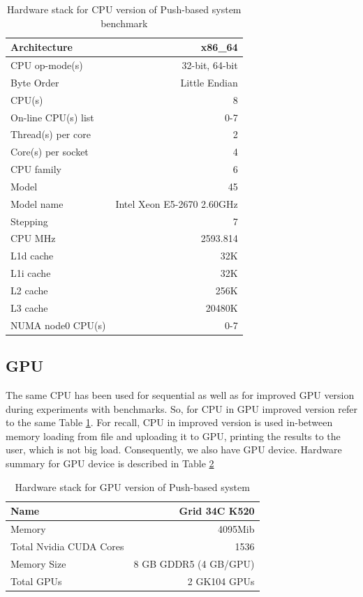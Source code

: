\documentclass[12pt,letterpaper]{report}
\begin{document}
\begin{table}[h!]
	\renewcommand*{\arraystretch}{1.5}
	\tabcolsep=0.12cm
	\centering
  \begin{tabular}{| l | r |}
   \hline
Architecture & x86\_64 \\  \hline
CPU op-mode(s) & 32-bit, 64-bit \\   \hline
Byte Order & Little Endian \\   \hline
CPU(s) & 8 \\   \hline
On-line CPU(s) list & 0-7 \\   \hline
Thread(s) per core & 2 \\   \hline
Core(s) per socket & 4 \\   \hline
CPU family & 6 \\   \hline
Model & 45 \\   \hline
Model name & Intel Xeon E5-2670 2.60GHz \\   \hline
Stepping & 7 \\   \hline
CPU MHz & 2593.814 \\  \hline  
L1d cache & 32K \\   \hline
L1i cache & 32K \\   \hline
L2 cache & 256K \\   \hline
L3 cache & 20480K \\   \hline
NUMA node0 CPU(s) & 0-7 \\  \hline
  \end{tabular}
    \caption{Hardware stack for CPU version of Push-based system benchmark}
      \label{tb:cpuhardware}
\end{table}

\subsection{GPU}

\hspace{3em} The same CPU has been used for sequential as well as for improved GPU version during experiments with benchmarks. So, for CPU in GPU improved version refer to the same Table \ref{tb:cpuhardware}. For recall, CPU in improved version is used in-between memory loading from file and uploading it to GPU, printing the results to the user, which is not big load. Consequently, we also have GPU device. Hardware summary for GPU device is described in Table \ref{tb:gpuhardware}

\begin{table}[h!]
	\renewcommand*{\arraystretch}{1.5}
	\tabcolsep=0.12cm
  \centering
  \begin{tabular}{| l | r |}
   \hline
	Name & Grid 34C K520 \\ \hline
	Memory & 4095Mib \\ \hline
	Total Nvidia CUDA Cores & 1536 \\ \hline
	Memory Size & 8 GB GDDR5 (4 GB/GPU) \\ \hline
	Total GPUs & 2 GK104 GPUs \\ \hline
  \end{tabular}
    \caption{Hardware stack for GPU version of Push-based system}
    	  \label{tb:gpuhardware}
\end{table}
\end{document}
